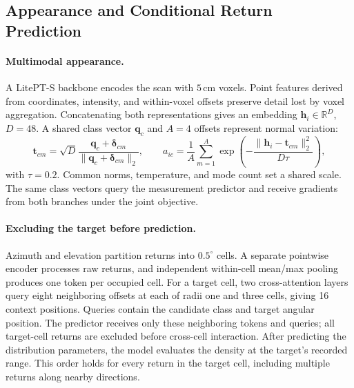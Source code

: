 \documentclass{article}
\newcommand{\R}{\mathbb{R}}
\begin{document}
\subsection{Appearance and Conditional Return Prediction}
\paragraph{Multimodal appearance.}
A LitePT-S backbone \citep{litept} encodes the scan with $5$\,cm voxels. Point features derived from coordinates, intensity, and within-voxel offsets preserve detail lost by voxel aggregation. Concatenating both representations gives an embedding $\mathbf h_i\in\R^D$, $D=48$. A shared class vector $\mathbf q_c$ and $A=4$ offsets represent normal variation:
\begin{equation}
 \mathbf t_{cm}=\sqrt D\frac{\mathbf q_c+\boldsymbol\delta_{cm}}{\|\mathbf q_c+\boldsymbol\delta_{cm}\|_2},\qquad
 a_{ic}=\frac1A\sum_{m=1}^{A}\exp\!\left(-\frac{\|\mathbf h_i-\mathbf t_{cm}\|_2^2}{D\tau}\right),
 \label{eq:appearance}
\end{equation}
with $\tau=0.2$. Common norms, temperature, and mode count set a shared scale. The same class vectors query the measurement predictor and receive gradients from both branches under the joint objective.

\paragraph{Excluding the target before prediction.}
Azimuth and elevation partition returns into $0.5^\circ$ cells. A separate pointwise encoder processes raw returns, and independent within-cell mean/max pooling produces one token per occupied cell. For a target cell, two cross-attention layers query eight neighboring offsets at each of radii one and three cells, giving 16 context positions. Queries contain the candidate class and target angular position. The predictor receives only these neighboring tokens and queries; all target-cell returns are excluded before cross-cell interaction. After predicting the distribution parameters, the model evaluates the density at the target's recorded range. This order holds for every return in the target cell, including multiple returns along nearby directions.
\end{document}
